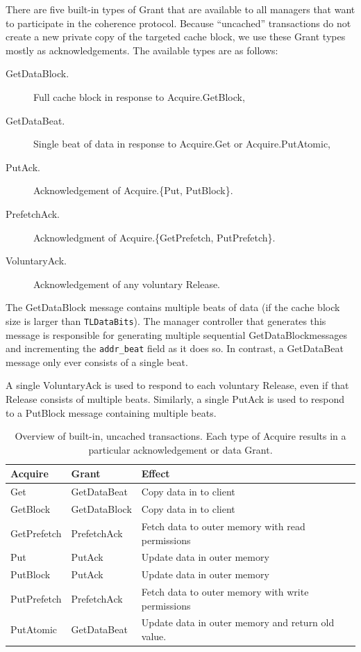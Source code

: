 There are five built-in types of Grant that are available to all managers that want to participate in the coherence protocol.
Because ``uncached'' transactions do not create a new private copy of the targeted cache block, we use these Grant types mostly as acknowledgements.
The available types are as follows:
\begin{description}
\item[GetDataBlock.] Full cache block in response to Acquire.GetBlock,
\item[GetDataBeat.] Single beat of data in response to Acquire.Get or Acquire.PutAtomic,
\item[PutAck.] Acknowledgement of Acquire.\{Put, PutBlock\}.
\item[PrefetchAck.] Acknowledgment of Acquire.\{GetPrefetch, PutPrefetch\}.
\item[VoluntaryAck.] Acknowledgement of any voluntary Release.
\end{description}

The GetDataBlock message contains multiple beats of data (if the cache block size is larger than {\tt TLDataBits}).
The manager controller that generates this message is responsible for generating multiple sequential GetDataBlockmessages and incrementing the {\tt addr\_beat} field as it does so.
In contrast, a GetDataBeat message only ever consists of a single beat.

A single VoluntaryAck is used to respond to each voluntary Release, even if that Release consists of multiple beats.
Similarly, a single PutAck is used to respond to a PutBlock message containing multiple beats.

\begin{table}[ht]
\begin{center}
\begin{tabular}{|l|l|l|}
    \hline
    Acquire & Grant & Effect \\ \hline \hline
    Get & GetDataBeat & Copy data in to client \\ \hline
    GetBlock & GetDataBlock & Copy data in to client \\ \hline
    GetPrefetch & PrefetchAck & Fetch data to outer memory with read permissions \\ \hline
    Put & PutAck & Update data in outer memory \\ \hline
    PutBlock & PutAck & Update data in outer memory \\ \hline
    PutPrefetch & PrefetchAck & Fetch data to outer memory with write permissions \\ \hline
    PutAtomic & GetDataBeat & Update data in outer memory and return old value. \\ \hline
\end{tabular}
\end{center}
\caption{Overview of built-in, uncached transactions. Each type of Acquire results in a particular acknowledgement or data Grant.}
\label{tab:uncached}
\end{table}

